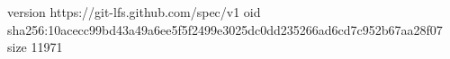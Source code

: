 version https://git-lfs.github.com/spec/v1
oid sha256:10acecc99bd43a49a6ee5f5f2499e3025dc0dd235266ad6cd7c952b67aa28f07
size 11971
